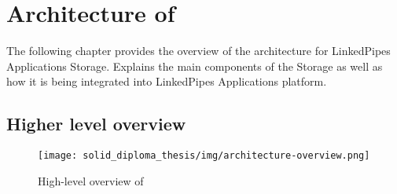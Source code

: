 \chapter{Architecture of \lpa{}}
\label{chap:num_4}

The following chapter provides the overview of the architecture for LinkedPipes Applications Storage. Explains the main components of the Storage as well as how it is being integrated into LinkedPipes Applications platform.

\section{Higher level overview}


\begin{figure}[h]
\centering
\texttt{[image: solid\_diploma\_thesis/img/architecture-overview.png]}
\caption{High-level overview of \lpas}
\label{fig:high-level-arch}
\end{figure}